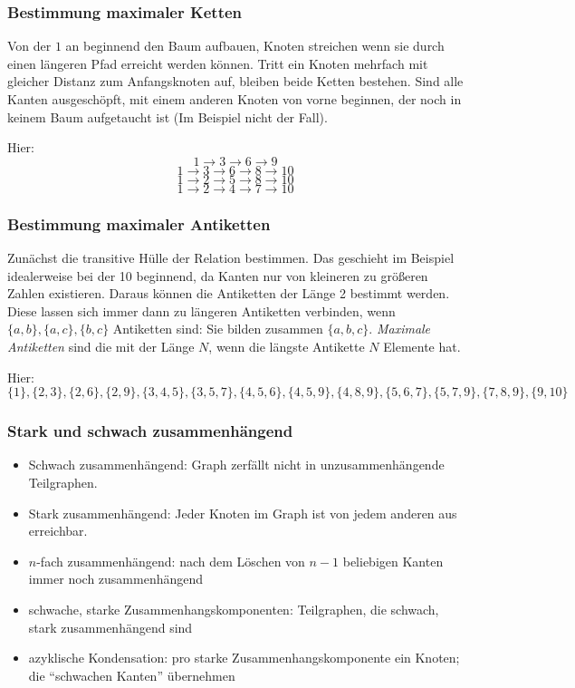 \documentclass[a4paper,10pt]{scrartcl}
\begin{document}
\subsubsection{Bestimmung maximaler Ketten}
Von der $1$ an beginnend den Baum aufbauen, Knoten streichen wenn sie durch einen längeren
Pfad erreicht werden können. Tritt ein Knoten mehrfach mit gleicher Distanz zum Anfangsknoten
auf, bleiben beide Ketten bestehen. Sind alle Kanten ausgeschöpft, mit einem anderen Knoten von
vorne beginnen, der noch in keinem Baum aufgetaucht ist (Im Beispiel nicht der Fall).

Hier:
\[1 \rightarrow 3 \rightarrow 6 \rightarrow 9\]
\[1 \rightarrow 3 \rightarrow 6 \rightarrow 8 \rightarrow 10\]
\[1 \rightarrow 2 \rightarrow 5 \rightarrow 8 \rightarrow 10\]
\[1 \rightarrow 2 \rightarrow 4 \rightarrow 7 \rightarrow 10\]

\subsubsection{Bestimmung maximaler Antiketten}
Zunächst die transitive Hülle der Relation bestimmen. Das geschieht im Beispiel idealerweise
bei der 10 beginnend, da Kanten nur von kleineren zu größeren Zahlen existieren. Daraus können
die Antiketten der Länge 2 bestimmt werden. Diese lassen sich immer dann zu längeren Antiketten
verbinden, wenn $\{a,b\}, \{a,c\}, \{b, c\}$ Antiketten sind: Sie bilden zusammen $\{a,b,c\}$.
\textit{Maximale Antiketten} sind die mit der Länge $N$, wenn die längste Antikette $N$
Elemente hat.

Hier:
\[\{1\}, \{2,3\}, \{2,6\}, \{2,9\}, \{3, 4,5\}, \{3, 5, 7\}, \{4, 5, 6\}, \{4,5,9\}, \{4,8,9\},
\{5,6,7\},\{5,7,9\}, \{7,8,9\}, \{9,10\}\]

\subsubsection{Stark und schwach zusammenhängend}
\begin{itemize}
    \item Schwach zusammenhängend: Graph zerfällt nicht in unzusammenhängende Teilgraphen.
    \item Stark zusammenhängend: Jeder Knoten im Graph ist von jedem anderen aus erreichbar.
    \item $n$-fach zusammenhängend: nach dem Löschen von $n−1$ beliebigen Kanten immer noch zusammenhängend
    \item schwache, starke Zusammenhangskomponenten: Teilgraphen, die schwach, stark zusammenhängend sind
    \item azyklische Kondensation: pro starke Zusammenhangskomponente ein Knoten; die “schwachen Kanten” übernehmen
\end{itemize}
\end{document}
